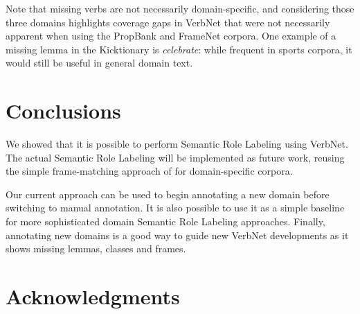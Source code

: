 Note that missing verbs are not necessarily domain-specific, and considering
those three domains highlights coverage gaps in VerbNet that were not
necessarily apparent when using the PropBank and FrameNet corpora. One example
of a missing lemma in the Kicktionary is \textit{celebrate}: while frequent in
sports corpora, it would still be useful in general domain text.

\section{Conclusions}

We showed that it is possible to perform Semantic Role Labeling using VerbNet.
The actual Semantic Role Labeling will be implemented as future work, reusing
the simple frame-matching approach of \cite{swier2005exploiting} for
domain-specific corpora.

Our current approach can be used to begin annotating a new domain before
switching to manual annotation. It is also possible to use it as a simple
baseline for more sophisticated domain Semantic Role Labeling approaches.
Finally, annotating new domains is a good way to guide new VerbNet developments
as it shows missing lemmas, classes and frames.

\section*{Acknowledgments}

